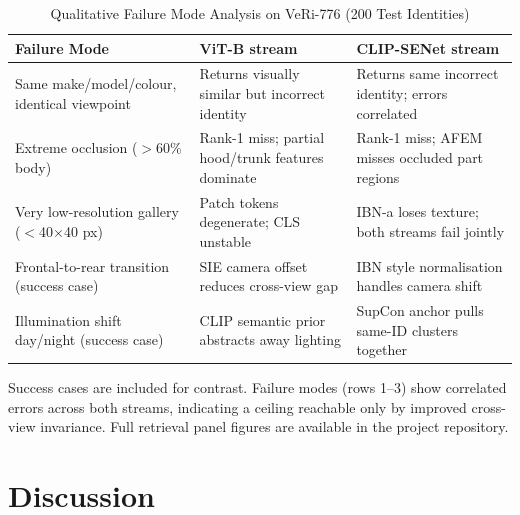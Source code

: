 \documentclass[11pt]{article}
\begin{document}
\begin{table}[!t]
  \caption{Qualitative Failure Mode Analysis on VeRi-776 (200 Test Identities)}
  \label{tab:qual}
  \centering
  \small
  \begin{tabular}{p{2.0cm}p{2.6cm}p{2.6cm}}
    \toprule
    \textbf{Failure Mode} & \textbf{ViT-B stream} & \textbf{CLIP-SENet stream} \\
    \midrule
    Same make/model/colour, identical viewpoint &
      Returns visually similar but incorrect identity &
      Returns same incorrect identity; errors correlated \\[2pt]
    Extreme occlusion ($>$60\% body) &
      Rank-1 miss; partial hood/trunk features dominate &
      Rank-1 miss; AFEM misses occluded part regions \\[2pt]
    Very low-resolution gallery ($<$40$\times$40 px) &
      Patch tokens degenerate; CLS unstable &
      IBN-a loses texture; both streams fail jointly \\[2pt]
    Frontal-to-rear transition (success case) &
      SIE camera offset reduces cross-view gap & 
      IBN style normalisation handles camera shift \\[2pt]
    Illumination shift day/night (success case) &
      CLIP semantic prior abstracts away lighting &
      SupCon anchor pulls same-ID clusters together \\
    \bottomrule
  \end{tabular}
  \vspace{2pt}
  {\footnotesize Success cases are included for contrast.
   Failure modes (rows 1--3) show correlated errors across both streams,
   indicating a ceiling reachable only by improved cross-view invariance.
   Full retrieval panel figures are available in the project
   repository.}
\end{table}

\section{Discussion}
\label{sec:discussion}
\end{document}
